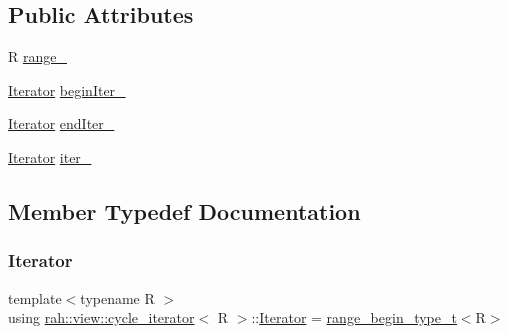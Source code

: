 \subsection*{Public Attributes}
\begin{DoxyCompactItemize}
\item 
R \mbox{\hyperlink{structrah_1_1view_1_1cycle__iterator_ad82f54467048a95f8e8f05e5a78afb48}{range\+\_\+}}
\item 
\mbox{\hyperlink{structrah_1_1view_1_1cycle__iterator_ac9761016862e6bb26b0ca5e923344b83}{Iterator}} \mbox{\hyperlink{structrah_1_1view_1_1cycle__iterator_a1daddc1b5ce6e1203aecb236a04d11d6}{begin\+Iter\+\_\+}}
\item 
\mbox{\hyperlink{structrah_1_1view_1_1cycle__iterator_ac9761016862e6bb26b0ca5e923344b83}{Iterator}} \mbox{\hyperlink{structrah_1_1view_1_1cycle__iterator_ac2b991834504ffc79a0d477588a4668e}{end\+Iter\+\_\+}}
\item 
\mbox{\hyperlink{structrah_1_1view_1_1cycle__iterator_ac9761016862e6bb26b0ca5e923344b83}{Iterator}} \mbox{\hyperlink{structrah_1_1view_1_1cycle__iterator_a49dea5baf32f7e9bc237b6f534513ada}{iter\+\_\+}}
\end{DoxyCompactItemize}


\subsection{Member Typedef Documentation}
\mbox{\label{structrah_1_1view_1_1cycle__iterator_ac9761016862e6bb26b0ca5e923344b83}} 
\subsubsection{\texorpdfstring{Iterator}{Iterator}\hspace{0.1cm}{\footnotesize\ttfamily [1/2]}}
{\footnotesize\ttfamily template$<$typename R $>$ \\
using \mbox{\hyperlink{structrah_1_1view_1_1cycle__iterator}{rah\+::view\+::cycle\+\_\+iterator}}$<$ R $>$\+::\mbox{\hyperlink{structrah_1_1view_1_1cycle__iterator_ac9761016862e6bb26b0ca5e923344b83}{Iterator}} =  \mbox{\hyperlink{namespacerah_a28aff4eeddcece6be65ff0b956d32d4a}{range\+\_\+begin\+\_\+type\+\_\+t}}$<$R$>$}

